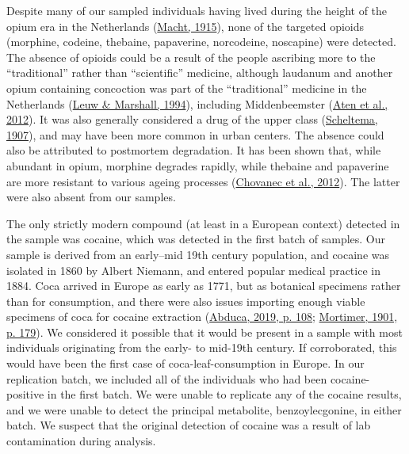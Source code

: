 \documentclass[
  letterpaper,
]{book}
\begin{document}
Despite many of our sampled individuals having lived during the height
of the opium era in the Netherlands
(\protect\hyperlink{ref-machtHistoryOpium1915}{Macht, 1915}), none of
the targeted opioids (morphine, codeine, thebaine, papaverine,
norcodeine, noscapine) were detected. The absence of opioids could be a
result of the people ascribing more to the ``traditional'' rather than
``scientific'' medicine, although laudanum and another opium containing
concoction was part of the ``traditional'' medicine in the Netherlands
(\protect\hyperlink{ref-leuwProhibitionLegalization1994}{Leuw \&
Marshall, 1994}), including Middenbeemster
(\protect\hyperlink{ref-aten400Jaar2012}{Aten et al., 2012}). It was
also generally considered a drug of the upper class
(\protect\hyperlink{ref-scheltemaOpiumTrade1907}{Scheltema, 1907}), and
may have been more common in urban centers. The absence could also be
attributed to postmortem degradation. It has been shown that, while
abundant in opium, morphine degrades rapidly, while thebaine and
papaverine are more resistant to various ageing processes
(\protect\hyperlink{ref-chovanecOpiumMasses2012}{Chovanec et al.,
2012}). The latter were also absent from our samples.

The only strictly modern compound (at least in a European context)
detected in the sample was cocaine, which was detected in the first
batch of samples. Our sample is derived from an early--mid 19th century
population, and cocaine was isolated in 1860 by Albert Niemann, and
entered popular medical practice in 1884. Coca arrived in Europe as
early as 1771, but as botanical specimens rather than for consumption,
and there were also issues importing enough viable specimens of coca for
cocaine extraction (\protect\hyperlink{ref-abucaCocaTrade2019}{Abduca,
2019, p. 108}; \protect\hyperlink{ref-mortimerHistoryCoca1901}{Mortimer,
1901, p. 179}). We considered it possible that it would be present in a
sample with most individuals originating from the early- to mid-19th
century. If corroborated, this would have been the first case of
coca-leaf-consumption in Europe. In our replication batch, we included
all of the individuals who had been cocaine-positive in the first batch.
We were unable to replicate any of the cocaine results, and we were
unable to detect the principal metabolite, benzoylecgonine, in either
batch. We suspect that the original detection of cocaine was a result of
lab contamination during analysis.
\end{document}

